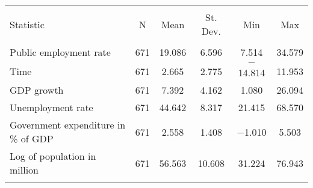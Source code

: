 
\begin{table}[!htbp] \centering 
  \caption{} 
  \label{} 
\footnotesize 
\begin{tabular}{@{\extracolsep{5pt}}lccccc} 
\\[-1.8ex]\hline 
\hline \\[-1.8ex] 
Statistic & \multicolumn{1}{c}{N} & \multicolumn{1}{c}{Mean} & \multicolumn{1}{c}{St. Dev.} & \multicolumn{1}{c}{Min} & \multicolumn{1}{c}{Max} \\ 
\hline \\[-1.8ex] 
Public employment rate & 671 & 19.086 & 6.596 & 7.514 & 34.579 \\ 
Time & 671 & 2.665 & 2.775 & $-$14.814 & 11.953 \\ 
GDP growth & 671 & 7.392 & 4.162 & 1.080 & 26.094 \\ 
Unemployment rate & 671 & 44.642 & 8.317 & 21.415 & 68.570 \\ 
Government expenditure in \% of GDP & 671 & 2.558 & 1.408 & $-$1.010 & 5.503 \\ 
Log of population in million & 671 & 56.563 & 10.608 & 31.224 & 76.943 \\ 
\hline \\[-1.8ex] 
\end{tabular} 
\end{table} 
